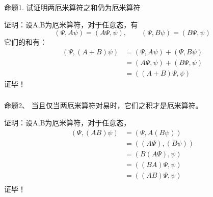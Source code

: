 \begin{frame} [allowframebreaks=]
    \frametitle{}
    \begin{tcolorbox1}{命题1.}
     试证明两厄米算符之和仍为厄米算符 
    \end{tcolorbox1}
    \alert{证明：}设A,B为厄米算符，对于任意态，有\\
    $$(\Psi, A\psi ) = (A\Psi, \psi), \qquad (\Psi, B\psi ) = (B\Psi, \psi)$$
    它们的和有： 
    \begin{equation*}
        \begin{split}
            (\Psi, (A+B)\psi ) &= (\Psi, A\psi ) + (\Psi, B\psi ) \\  
            &=(A\Psi, \psi ) + (B\Psi, \psi ) \\
            &=((A+B)\Psi, \psi ) 
         \end{split}
    \end{equation*}  
    证毕！
\end{frame} 

\begin{frame} [allowframebreaks=]
    \frametitle{}
    \begin{tcolorbox1}{命题2、}
        当且仅当两厄米算符对易时，它们之积才是厄米算符。
    \end{tcolorbox1}
    \alert{证明：}设A,B为厄米算符，对于任意态，
    \begin{equation*}
        \begin{split}
            (\Psi, (AB)\psi ) &= (\Psi, A(B\psi) ) \\  
            &=((A \Psi), (B\psi) )  \\
            &=(B(A \Psi), \psi )  \\
            &=( (BA) \Psi, \psi )  \\
            &=( (AB) \Psi, \psi )  \\
         \end{split}
    \end{equation*}  
    证毕！
\end{frame}  

